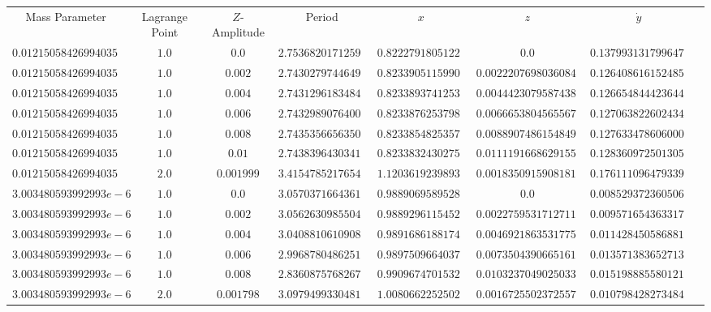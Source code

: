 \documentclass[conf]{new-aiaa}
\begin{document}
\begin{landscape}
\begin{table}
\begin{tabular}{cccccccc}
    Mass Parameter & Lagrange Point & $Z$-Amplitude & Period & $x$ & $z$ & $\dot{y}$ \\
    $0.012150584269940356$ & $1.0$ & $0.0$ & $2.7536820171259744$ & $0.8222791805122408$ & $0.0$ & $0.13799313179964737$\\
    $0.012150584269940356$ & $1.0$ & $0.002$ & $2.7430279744649004$ & $0.8233905115990996$ & $0.0022207698036084363$ & $0.1264086161524851$\\
    $0.012150584269940356$ & $1.0$ & $0.004$ & $2.743129618348479$ & $0.8233893741253737$ & $0.004442307958743803$ & $0.12665484442364439$\\
    $0.012150584269940356$ & $1.0$ & $0.006$ & $2.743298907640046$ & $0.8233876253798795$ & $0.006665380456556792$ & $0.12706382260243482$\\
    $0.012150584269940356$ & $1.0$ & $0.008$ & $2.7435356656350174$ & $0.8233854825357569$ & $0.008890748615484967$ & $0.12763347860600016$\\
    $0.012150584269940356$ & $1.0$ & $0.01$ & $2.7438396430341294$ & $0.8233832430275673$ & $0.011119166862915583$ & $0.12836097250130557$\\
    $0.012150584269940356$ & $2.0$ & $0.001999$ & $3.4154785217654346$ & $1.1203619239893596$ & $0.001835091590818184$ & $0.17611109647933998$\\
    $3.003480593992993e-6$ & $1.0$ & $0.0$ & $3.057037166436106$ & $0.9889069589528534$ & $0.0$ & $0.008529372360506582$\\
    $3.003480593992993e-6$ & $1.0$ & $0.002$ & $3.0562630985504198$ & $0.9889296115452058$ & $0.0022759531712711633$ & $0.009571654363317172$\\
    $3.003480593992993e-6$ & $1.0$ & $0.004$ & $3.0408810610908192$ & $0.9891686188174361$ & $0.0046921863531775585$ & $0.011428450586881073$\\
    $3.003480593992993e-6$ & $1.0$ & $0.006$ & $2.9968780486251165$ & $0.9897509664037121$ & $0.007350439066516196$ & $0.013571383652713521$\\
    $3.003480593992993e-6$ & $1.0$ & $0.008$ & $2.8360875768267277$ & $0.9909674701532162$ & $0.010323704902503393$ & $0.015198885580121493$\\
    $3.003480593992993e-6$ & $2.0$ & $0.001798$ & $3.09794993304811$ & $1.0080662252502852$ & $0.001672550237255738$ & $0.010798428273484711$\\

\end{tabular}
\end{table}
\end{landscape}
\end{document}
